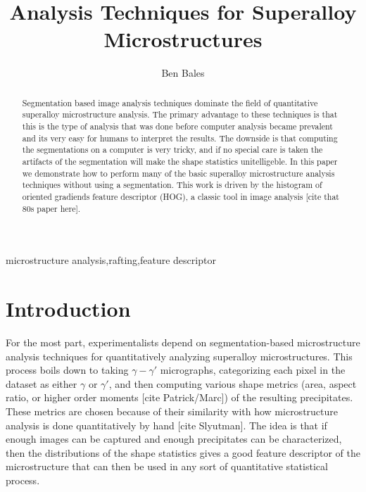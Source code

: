 \documentclass[review]{elsarticle}
\date{}
\begin{document}
	\begin{frontmatter}
		\title{Analysis Techniques for Superalloy Microstructures}

		\author{Ben Bales}
		\address{University of California Santa Barbara}

		\begin{abstract}
			Segmentation based image analysis techniques dominate the field of quantitative superalloy microstructure analysis. The primary advantage to these techniques is that this is the type of analysis that was done before computer analysis became prevalent and its very easy for humans to interpret the results. The downside is that computing the segmentations on a computer is very tricky, and if no special care is taken the artifacts of the segmentation will make the shape statistics unitelligeble. In this paper we demonstrate how to perform many of the basic superalloy microstructure analysis techniques without using a segmentation. This work is driven by the histogram of oriented gradiends feature descriptor (HOG), a classic tool in image analysis [cite that 80s paper here].
		\end{abstract}

		\begin{keyword}
			microstructure analysis\sep rafting\sep feature descriptor
		\end{keyword}
	\end{frontmatter}

	\section{Introduction}
	For the most part, experimentalists \cite{comer} \cite{girsh} \cite{gradtex} \cite{hog} \cite{marc1} \cite{marc2} \cite{marc3} \cite{decost} \cite{molly} \cite{spherical} \cite{threeDM} \cite{tribeam} \cite{twoDM} \cite{underwoord} \cite{ywang2} \cite{ywang1} depend on segmentation-based microstructure analysis techniques for quantitatively analyzing superalloy microstructures. This process boils down to taking $\gamma-\gamma'$ micrographs, categorizing each pixel in the dataset as either $\gamma$ or $\gamma'$, and then computing various shape metrics (area, aspect ratio, or higher order moments [cite Patrick/Marc]) of the resulting precipitates. These metrics are chosen because of their similarity with how microstructure analysis is done quantitatively by hand [cite Slyutman]. The idea is that if enough images can be captured and enough precipitates can be characterized, then the distributions of the shape statistics gives a good feature descriptor of the microstructure that can then be used in any sort of quantitative statistical process.
\end{document}
